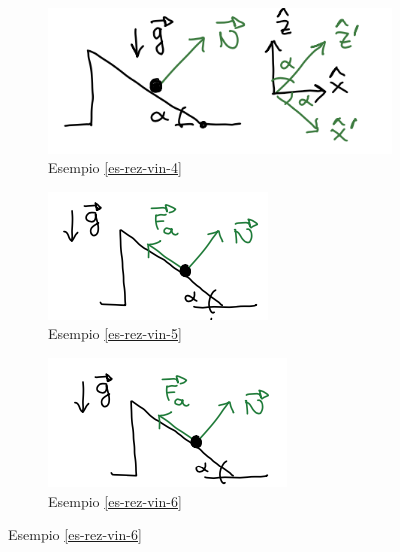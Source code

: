 \begin{figure}[h!]
    \vspace{-10pt}
    \centering
    \begin{subfigure}[b]{0.25\textwidth}
        \centering
        \includegraphics[width=\textwidth]{images/esempio-reazioni-vincolari-4.png}
        \caption*{Esempio \ref{es-rez-vin-4}}
    \end{subfigure}
    \hspace{20pt}
    \begin{subfigure}[b]{0.25\textwidth}
        \centering
        \includegraphics[width=\textwidth]{images/esempio-reazioni-vincolari-5.png}
        \caption*{Esempio \ref{es-rez-vin-5}}
    \end{subfigure}
    \hspace{20pt}
    \begin{subfigure}[b]{0.2\textwidth}
        \centering
        \includegraphics[width=\textwidth]{images/esempio-reazioni-vincolari-6.png}
        \caption*{Esempio \ref{es-rez-vin-6}}
    \end{subfigure}
\end{figure}
